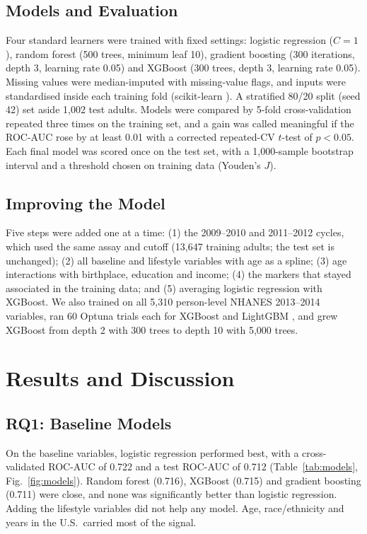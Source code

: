 \documentclass[conference]{IEEEtran}
\begin{document}
\subsection{Models and Evaluation}
Four standard learners were trained with fixed settings: logistic regression ($C=1$), random forest (500 trees, minimum leaf 10),
gradient boosting (300 iterations, depth 3, learning rate 0.05) and XGBoost \cite{xgboost} (300 trees, depth 3, learning rate 0.05).
Missing values were median-imputed with missing-value flags, and inputs were standardised inside each training fold (scikit-learn
\cite{sklearn}). A stratified 80/20 split (seed 42) set aside 1,002 test adults. Models were compared by 5-fold cross-validation
repeated three times on the training set, and a gain was called meaningful if the ROC-AUC rose by at least 0.01 with a corrected
repeated-CV $t$-test \cite{nadeau2003} of $p<0.05$. Each final model was scored once on the test set, with a 1,000-sample bootstrap
interval and a threshold chosen on training data (Youden's $J$).

\subsection{Improving the Model}
Five steps were added one at a time: (1) the 2009--2010 and 2011--2012 cycles, which used the same assay and cutoff (13,647 training
adults; the test set is unchanged); (2) all baseline and lifestyle variables with age as a spline; (3) age interactions with
birthplace, education and income; (4) the markers that stayed associated in the training data; and (5) averaging logistic regression
with XGBoost. We also trained on all 5,310 person-level NHANES 2013--2014 variables, ran 60 Optuna \cite{optuna} trials each for
XGBoost and LightGBM \cite{lightgbm}, and grew XGBoost from depth 2 with 300 trees to depth 10 with 5,000 trees.

\section{Results and Discussion}
\subsection{RQ1: Baseline Models}
On the baseline variables, logistic regression performed best, with a cross-validated ROC-AUC of 0.722 and a test ROC-AUC of 0.712
(Table~\ref{tab:models}, Fig.~\ref{fig:models}). Random forest (0.716), XGBoost (0.715) and gradient boosting (0.711) were close, and none
was significantly better than logistic regression. Adding the lifestyle variables did not help any model. Age, race/ethnicity and years in
the U.S.\ carried most of the signal.
\end{document}
